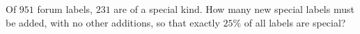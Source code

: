 Of $951$ forum labels, $231$ are of a special kind. How many new special labels must be added, with no other additions, so that exactly $25\%$ of all labels are special?
